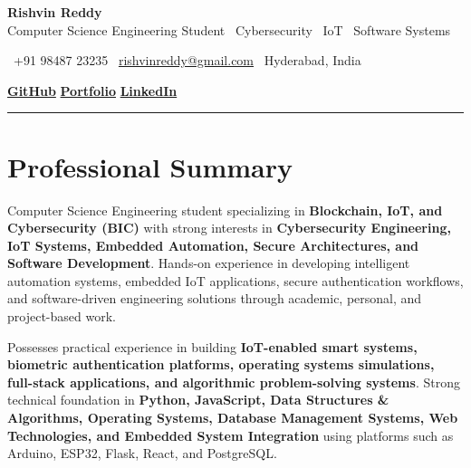 \documentclass[a4paper,11pt]{article}
\begin{document}

\begin{center}

{\Huge \textbf{Rishvin Reddy}}\\[4pt]

{\normalsize
Computer Science Engineering Student
\textbar\
Cybersecurity
\textbar\
IoT
\textbar\
Software Systems
}

\vspace{6pt}

\small

\faPhone\ +91 98487 23235
\hspace{1.2em}
\faEnvelope\
\href{mailto:rishvinreddy@gmail.com}
{rishvinreddy@gmail.com}
\hspace{1.2em}
\faMapMarker*\ Hyderabad, India

\vspace{4pt}

\href{https://github.com/RishvinReddy}
{\textbf{GitHub}}
\hspace{1.5em}
\href{https://rishvinreddy.github.io}
{\textbf{Portfolio}}
\hspace{1.5em}
\href{https://www.linkedin.com/in/rishvinreddy/}
{\textbf{LinkedIn}}

\vspace{6pt}
\hrule

\end{center}

\vspace{-8pt}



\section{Professional Summary}

Computer Science Engineering student specializing in \textbf{Blockchain, IoT, and Cybersecurity (BIC)} with strong interests in \textbf{Cybersecurity Engineering, IoT Systems, Embedded Automation, Secure Architectures, and Software Development}. Hands-on experience in developing intelligent automation systems, embedded IoT applications, secure authentication workflows, and software-driven engineering solutions through academic, personal, and project-based work.

Possesses practical experience in building \textbf{IoT-enabled smart systems, biometric authentication platforms, operating systems simulations, full-stack applications, and algorithmic problem-solving systems}. Strong technical foundation in \textbf{Python, JavaScript, Data Structures \& Algorithms, Operating Systems, Database Management Systems, Web Technologies, and Embedded System Integration} using platforms such as Arduino, ESP32, Flask, React, and PostgreSQL.
\end{document}
